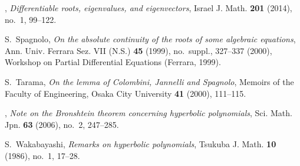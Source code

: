 \documentclass[12pt]{amsart}
\theoremstyle{plain}
\theoremstyle{definition}
\numberwithin{equation}{section}
\begin{document}
\begin{thebibliography}{10}
\bysame, \emph{Differentiable roots, eigenvalues, and eigenvectors}, Israel J.
  Math. \textbf{201} (2014), no.~1, 99--122. 

S.~Spagnolo, \emph{On the absolute continuity of the roots of some algebraic
  equations}, Ann. Univ. Ferrara Sez. VII (N.S.) \textbf{45} (1999),
  no.~suppl., 327--337 (2000), Workshop on Partial Differential Equations
  (Ferrara, 1999).

S.~Tarama, \emph{{On the lemma of Colombini, Jannelli and Spagnolo}}, Memoirs
  of the Faculty of Engineering, Osaka City University \textbf{41} (2000),
  111--115.

\bysame, \emph{Note on the {B}ronshtein theorem concerning hyperbolic
  polynomials}, Sci. Math. Jpn. \textbf{63} (2006), no.~2, 247--285.

S.~Wakabayashi, \emph{Remarks on hyperbolic polynomials}, Tsukuba J. Math.
  \textbf{10} (1986), no.~1, 17--28.

\end{thebibliography}
\end{document}
